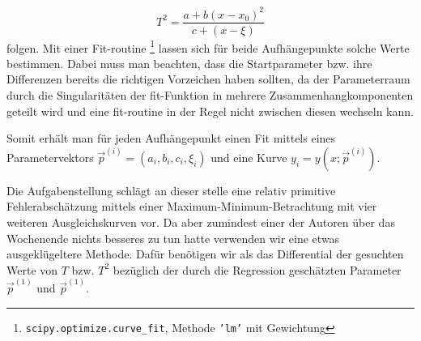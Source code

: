 \[
    T^2 = \frac{a + b (x - x_0)^2}{c + (x - \xi)}
\]
folgen. Mit einer Fit-routine%
\footnote{\texttt{scipy.optimize.curve\_fit}, Methode \texttt{'lm'} mit Gewichtung}
lassen sich für beide Aufhängepunkte solche Werte bestimmen. Dabei muss man beachten, dass die Startparameter bzw. ihre Differenzen bereits die richtigen Vorzeichen haben sollten, da der Parameterraum durch die Singularitäten der fit-Funktion in mehrere Zusammenhangkomponenten geteilt wird und eine fit-routine in der Regel nicht zwischen diesen wechseln kann.

Somit erhält man für jeden Aufhängepunkt einen Fit mittels eines Parametervektors $\vec{p}^{(i)} = (a_i, b_i, c_i, \xi_i)$ und eine Kurve $y_i = y(x; \vec{p}^{(i)})$.

Die Aufgabenstellung schlägt an dieser stelle eine relativ primitive Fehlerabschätzung mittels einer Maximum-Minimum-Betrachtung mit vier weiteren Ausgleichskurven vor. Da aber zumindest einer der Autoren über das Wochenende nichts besseres zu tun hatte verwenden wir eine etwas ausgeklügeltere Methode. Dafür benötigen wir als das Differential der gesuchten Werte von $T$ bzw. $T^2$ bezüglich der durch die Regression geschätzten Parameter $\vec{p}^{(1)}$ und $\vec{p}^{(1)}$.

